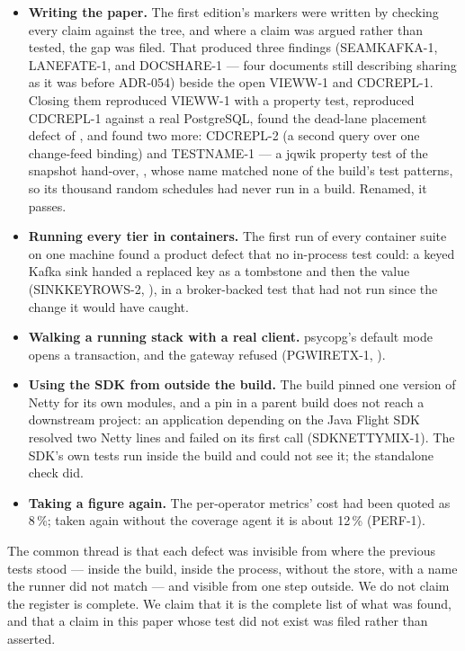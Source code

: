\documentclass[11pt,a4paper]{article}
\renewcommand{\_}{\oldunderscore\allowbreak}
\newcommand{\code}[1]{\texttt{\pvbreakable{#1}}}
\begin{document}
\begin{itemize}[leftmargin=*,itemsep=3pt]
\item \textbf{Writing the paper.} The first edition's markers were written by checking every claim against
      the tree, and where a claim was argued rather than tested, the gap was filed. That produced three
      findings (SEAMKAFKA-1, LANEFATE-1, and DOCSHARE-1 --- four documents still describing sharing as it
      was before ADR-054) beside the open VIEWW-1 and CDCREPL-1. Closing them reproduced VIEWW-1 with a
      property test, reproduced CDCREPL-1 against a real PostgreSQL, found the dead-lane placement defect
      of , and found two more: CDCREPL-2 (a second query over one change-feed binding) and
      TESTNAME-1 --- a jqwik property test of the snapshot hand-over, \code{SnapshotHandoffProperties},
      whose name matched none of the build's test patterns, so its thousand random schedules had never run
      in a build. Renamed, it passes.
\item \textbf{Running every tier in containers.} The first run of every container suite on one machine
      found a product defect that no in-process test could: a keyed Kafka sink handed a replaced key as a
      tombstone and then the value (SINKKEYROWS-2, ), in a broker-backed test that had
      not run since the change it would have caught.
\item \textbf{Walking a running stack with a real client.} psycopg's default mode opens a transaction,
      and the gateway refused \code{BEGIN} (PGWIRETX-1, ).
\item \textbf{Using the SDK from outside the build.} The build pinned one version of Netty for its own
      modules, and a pin in a parent build does not reach a downstream project: an application depending
      on the Java Flight SDK resolved two Netty lines and failed on its first call (SDKNETTYMIX-1). The
      SDK's own tests run inside the build and could not see it; the standalone check did.
\item \textbf{Taking a figure again.} The per-operator metrics' cost had been quoted as 8\,\%; taken again
      without the coverage agent it is about 12\,\% (PERF-1).
\end{itemize}

The common thread is that each defect was invisible from where the previous tests stood --- inside the
build, inside the process, without the store, with a name the runner did not match --- and visible from
one step outside. We do not claim the register is complete. We claim that it is the complete list of
what was found, and that a claim in this paper whose test did not exist was filed rather than asserted.
\end{document}
